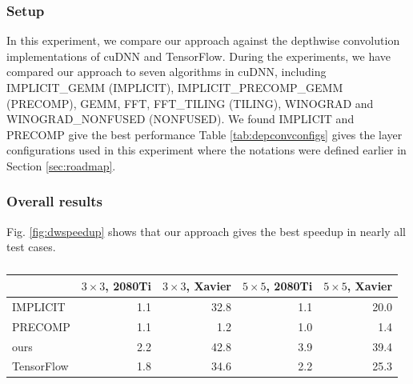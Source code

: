 \subsubsection{Setup} In this experiment, we compare our approach against the depthwise convolution implementations of cuDNN and TensorFlow.
During the experiments, we have compared our approach to seven algorithms in cuDNN, including IMPLICIT\_GEMM (IMPLICIT), IMPLICIT\_PRECOMP\_GEMM (PRECOMP), GEMM, FFT, FFT\_TILING (TILING), WINOGRAD and WINOGRAD\_NONFUSED (NONFUSED). We found IMPLICIT and PRECOMP give the best performance  Table \ref{tab:depconvconfigs} gives the layer configurations used in this experiment where the notations were defined earlier in Section \ref{sec:roadmap}.


\subsubsection{Overall results}
 Fig. \ref{fig:dwspeedup} shows that our approach gives the best speedup in nearly all test cases. 

\begin{table}[]
\setlength{\tabcolsep}{2.3pt}
\caption{}
\vspace{-3mm}
\label{tab:dwspeedups}
\centering
{}
\begin{threeparttable}
\begin{tabular}{l|r|r|r|r}
\toprule
& $3 \times 3$, 2080Ti & $3 \times 3$, Xavier &$5 \times 5$, 2080Ti&$5 \times 5$, Xavier\\
\midrule
IMPLICIT & 1.1 & 32.8 & 1.1 & 20.0\\
PRECOMP & 1.1 & 1.2 & 1.0 & 1.4\\
ours & 2.2 & 42.8 & 3.9 &39.4 \\
TensorFlow & 1.8 & 34.6 & 2.2 & 25.3\\

\bottomrule
\end{tabular}
\end{threeparttable}
\end{table}

